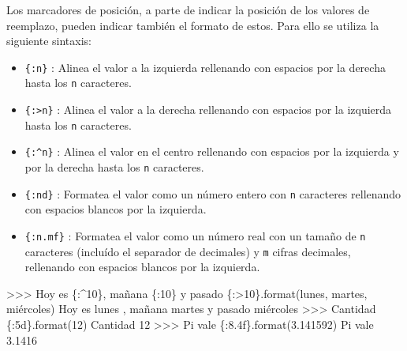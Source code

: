 \documentclass[
  spanish,
  a4paper,
]{scrreport}
\newenvironment{Shaded}{\begin{snugshade}}{\end{snugshade}}
\newcommand{\BuiltInTok}[1]{\textcolor[rgb]{0.00,0.23,0.31}{#1}}
\newcommand{\CommentTok}[1]{\textcolor[rgb]{0.37,0.37,0.37}{#1}}
\newcommand{\DecValTok}[1]{\textcolor[rgb]{0.68,0.00,0.00}{#1}}
\newcommand{\ErrorTok}[1]{\textcolor[rgb]{0.68,0.00,0.00}{#1}}
\newcommand{\NormalTok}[1]{\textcolor[rgb]{0.00,0.23,0.31}{#1}}
\newcommand{\OperatorTok}[1]{\textcolor[rgb]{0.37,0.37,0.37}{#1}}
\newcommand{\SpecialCharTok}[1]{\textcolor[rgb]{0.37,0.37,0.37}{#1}}
\newcommand{\StringTok}[1]{\textcolor[rgb]{0.13,0.47,0.30}{#1}}
\providecommand{\tightlist}{%
  \setlength{\itemsep}{0pt}\setlength{\parskip}{0pt}}
\begin{document}
Los marcadores de posición, a parte de indicar la posición de los
valores de reemplazo, pueden indicar también el formato de estos. Para
ello se utiliza la siguiente sintaxis:

\begin{itemize}
\tightlist
\item
  \texttt{\{:n\}} : Alinea el valor a la izquierda rellenando con
  espacios por la derecha hasta los \texttt{n} caracteres.
\item
  \texttt{\{:\textgreater{}n\}} : Alinea el valor a la derecha
  rellenando con espacios por la izquierda hasta los \texttt{n}
  caracteres.
\item
  \texttt{\{:\^{}n\}} : Alinea el valor en el centro rellenando con
  espacios por la izquierda y por la derecha hasta los \texttt{n}
  caracteres.
\item
  \texttt{\{:nd\}} : Formatea el valor como un número entero con
  \texttt{n} caracteres rellenando con espacios blancos por la
  izquierda.
\item
  \texttt{\{:n.mf\}} : Formatea el valor como un número real con un
  tamaño de \texttt{n} caracteres (incluído el separador de decimales) y
  \texttt{m} cifras decimales, rellenando con espacios blancos por la
  izquierda.
\end{itemize}

\begin{Shaded}
\begin{Highlighting}[]
\OperatorTok{\textgreater{}\textgreater{}\textgreater{}} \StringTok{\textquotesingle{}Hoy es }\SpecialCharTok{\{:\^{}10\}}\StringTok{, mañana }\SpecialCharTok{\{:10\}}\StringTok{ y pasado }\SpecialCharTok{\{:\textgreater{}10\}}\StringTok{\textquotesingle{}}\NormalTok{.}\BuiltInTok{format}\NormalTok{(}\StringTok{\textquotesingle{}lunes\textquotesingle{}}\NormalTok{, }\StringTok{\textquotesingle{}martes\textquotesingle{}}\NormalTok{, }\StringTok{\textquotesingle{}miércoles\textquotesingle{}}\NormalTok{)}
\CommentTok{\textquotesingle{}Hoy es   lunes   , mañana martes     y pasado  miércoles\textquotesingle{}}
\OperatorTok{\textgreater{}\textgreater{}\textgreater{}} \StringTok{\textquotesingle{}Cantidad }\SpecialCharTok{\{:5d\}}\StringTok{\textquotesingle{}}\NormalTok{.}\BuiltInTok{format}\NormalTok{(}\DecValTok{12}\NormalTok{)}\StringTok{\textquotesingle{}}
\ErrorTok{\textquotesingle{}Cantidad    12\textquotesingle{}}
\ErrorTok{\textgreater{}\textgreater{}\textgreater{} \textquotesingle{}Pi vale \{:8.4f\}\textquotesingle{}.format(3.141592)}
\CommentTok{\textquotesingle{}Pi vale   3.1416\textquotesingle{}}
\end{Highlighting}
\end{Shaded}
\end{document}

